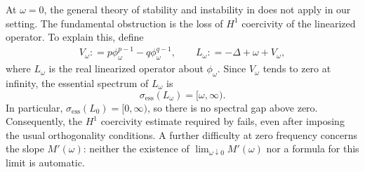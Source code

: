 \documentclass[12pt, a4paper, reqno]{amsart}
\numberwithin{equation}{section}
\theoremstyle{definition}
\theoremstyle{remark}
\newcommand{\ce}{\mathrel{\mathop:}=}
\begin{document}
At $\omega=0$, the general theory of stability and instability in \cite{GSS87} does not apply in our setting. The fundamental obstruction is the loss of $H^1$ coercivity of the linearized operator. To explain this, define
\begin{align}
\label{eq:lin}
  V_\omega\ce p\phi_\omega^{p-1}-q\phi_\omega^{q-1},
  \qquad L_\omega\ce-\Delta+\omega+V_\omega,
\end{align}
where $L_\omega$ is the real linearized operator about $\phi_\omega$.
Since $V_\omega$ tends to zero at infinity, the essential spectrum of $L_\omega$ is
\begin{equation}
\label{ess-spc}
  \sigma_{\mathrm{ess}}(L_\omega)=[\omega,\infty).
\end{equation}
In particular, $\sigma_{\mathrm{ess}}(L_0)=[0,\infty)$, so there is no spectral gap above zero. Consequently, the $H^1$ coercivity estimate required by \cite{GSS87} fails, even after imposing the usual orthogonality conditions. A further difficulty at zero frequency concerns the slope $M'(\omega)$: neither the existence of $\lim_{\omega\downarrow0}M'(\omega)$ nor a formula for this limit is automatic.
\end{document}
